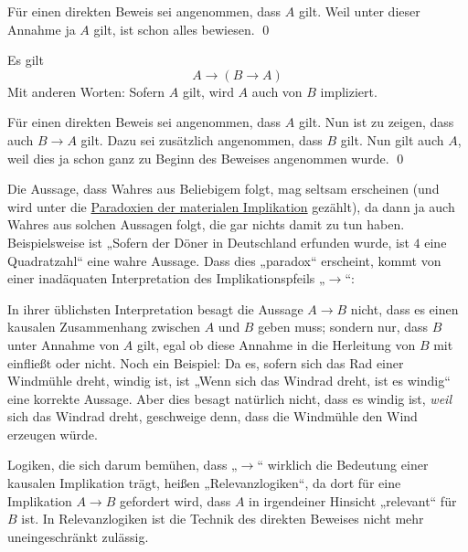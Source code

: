 \begin{bew}
    Für einen direkten Beweis sei angenommen, dass $A$ gilt. Weil unter dieser Annahme ja $A$ gilt, ist schon alles bewiesen. \qed
\end{bew}

  
\begin{satz}\label{wahresausbeliebigem}
    Es gilt
        \[ A \to (B\to A)   \]
    Mit anderen Worten: Sofern $A$ gilt, wird $A$ auch von $B$ impliziert.
\end{satz}


\begin{bew}
    Für einen direkten Beweis sei angenommen, dass $A$ gilt. Nun ist zu zeigen, dass auch $B\to A$ gilt. Dazu sei zusätzlich angenommen, dass $B$ gilt. Nun gilt auch $A$, weil dies ja schon ganz zu Beginn des Beweises angenommen wurde. \qed
\end{bew}


\begin{bem}
    Die Aussage, dass Wahres aus Beliebigem folgt, mag seltsam erscheinen (und wird unter die \href{https://de.wikipedia.org/wiki/Paradoxien_der_materialen_Implikation}{Paradoxien der materialen Implikation} gezählt), da dann ja auch Wahres aus solchen Aussagen folgt, die gar nichts damit zu tun haben. Beispielsweise ist „Sofern der Döner in Deutschland erfunden wurde, ist $4$ eine Quadratzahl“ eine wahre Aussage. Dass dies „paradox“ erscheint, kommt von einer inadäquaten Interpretation des Implikationspfeils „$\to$“:
    
    In ihrer üblichsten Interpretation besagt die Aussage $A\to B$ nicht, dass es einen kausalen Zusammenhang zwischen $A$ und $B$ geben muss; sondern nur, dass $B$ unter Annahme von $A$ gilt, egal ob diese Annahme in die Herleitung von $B$ mit einfließt oder nicht. Noch ein Beispiel: Da es, sofern sich das Rad einer Windmühle dreht, windig ist, ist „Wenn sich das Windrad dreht, ist es windig“ eine korrekte Aussage. Aber dies besagt natürlich nicht, dass es windig ist, \emph{weil} sich das Windrad dreht, geschweige denn, dass die Windmühle den Wind erzeugen würde.
\end{bem}


\begin{vorschau}[* Relevanzlogiken]
    Logiken, die sich darum bemühen, dass „$\to$“ wirklich die Bedeutung einer kausalen Implikation trägt, heißen „Relevanzlogiken“, da dort für eine Implikation $A\to B$ gefordert wird, dass $A$ in irgendeiner Hinsicht „relevant“ für $B$ ist. In Relevanzlogiken ist die Technik des direkten Beweises nicht mehr uneingeschränkt zulässig.
\end{vorschau}


